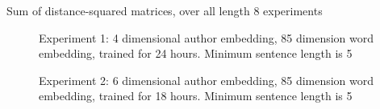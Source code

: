 \documentclass{article}%
\begin{document}
\begin{table}[]
\caption{Sum of distance-squared matrices, over all length 8 experiments}
\end{table}




\begin{figure}
\noindent{}
\caption{Experiment 1: 4 dimensional author embedding, 85 dimension word embedding, trained for 24 hours. Minimum sentence length is 5}
\end{figure}


\begin{figure}
\noindent{}
\caption{Experiment 2: 6 dimensional author embedding, 85 dimension word embedding, trained for 18 hours. Minimum sentence length is 5}
\end{figure}
\end{document}
